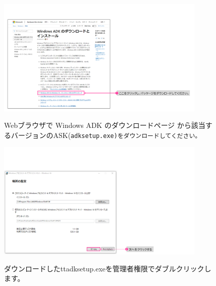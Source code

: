 \begin{figure}[h]
    \begin{minipage}{0.6\textwidth}
        \vspace{0cm}
        \includegraphics[width=10cm]{figures/Install_WinADK-01.png}
    \end{minipage}
    \begin{minipage}{0.4\textwidth}
        Webブラウザで Windows ADK のダウンロードページ\protect\footnotemark
        から該当するバージョンのASK(\tt{adksetup.exe})をダウンロードしてください。
    \end{minipage}
\end{figure}

\begin{figure}[hp]
    \begin{minipage}{0.6\textwidth}
        \vspace{0cm}
        \includegraphics[width=10cm]{figures/Install_WinADK-02.png}
    \end{minipage}
    \begin{minipage}{0.4\textwidth}
        ダウンロードしたtt{adksetup.exe}を管理者権限でダブルクリックします。
    \end{minipage}
\end{figure}

